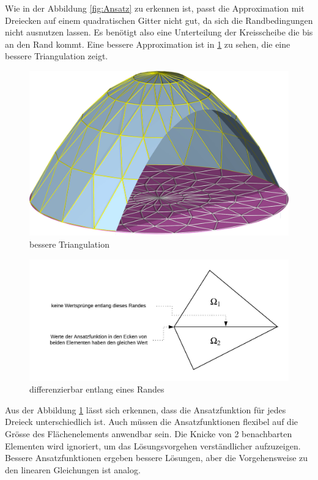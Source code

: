 Wie in der Abbildung \ref{fig:Ansatz} zu erkennen ist, passt die Approximation mit Dreiecken auf einem quadratischen Gitter nicht gut, da sich die Randbedingungen nicht ausnutzen lassen. Es benötigt also eine Unterteilung der Kreisscheibe die bis an den Rand kommt. Eine bessere Approximation ist in \ref{fig:besser Approx} zu sehen, die eine bessere Triangulation zeigt.
\begin{figure}[h!]
	\centering
	\includegraphics[scale=0.8]{papers/fem/Images/polar.jpg}
	\caption{bessere Triangulation}
	\label{fig:besser Approx}
\end{figure}
\begin{figure}[h]
	\centering
	\includegraphics[scale=0.8]{papers/fem/Images/Rand.jpeg}
	\caption{differenzierbar entlang eines Randes}
	\label{fig:Randbedingung}
\end{figure}
Aus der Abbildung \ref{fig:besser Approx} lässt sich erkennen, dass die Ansatzfunktion für jedes Dreieck unterschiedlich ist. Auch müssen die Ansatzfunktionen flexibel auf die Grösse des Flächenelements anwendbar sein. Die Knicke von 2 benachbarten Elementen wird ignoriert, um das Lösungsvorgehen verständlicher aufzuzeigen. Bessere Ansatzfunktionen ergeben bessere Lösungen, aber die Vorgehensweise zu den linearen Gleichungen ist analog.
